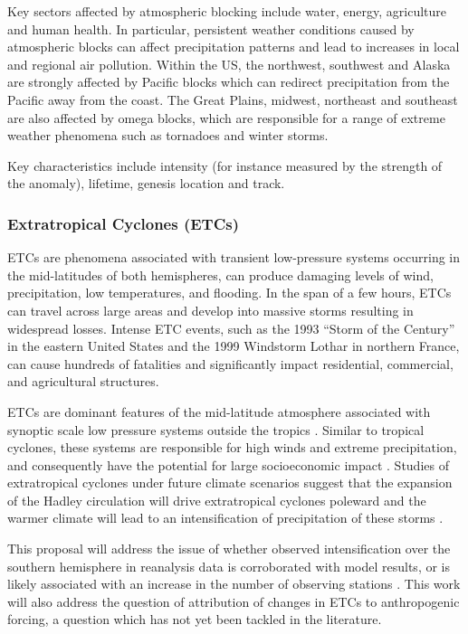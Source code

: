 \documentclass[11pt]{article}
\begin{document}
Key sectors affected by atmospheric blocking include water, energy, agriculture and human health.  In particular, persistent weather conditions caused by atmospheric blocks can affect precipitation patterns and lead to increases in local and regional air pollution.  Within the US, the northwest, southwest and Alaska are strongly affected by Pacific blocks which can redirect precipitation from the Pacific away from the coast.  The Great Plains, midwest, northeast and southeast are also affected by omega blocks, which are responsible for a range of extreme weather phenomena such as tornadoes and winter storms.

Key characteristics include intensity (for instance measured by the strength of the anomaly), lifetime, genesis location and track.

\subsubsection*{Extratropical Cyclones (ETCs)}

ETCs are phenomena associated with transient low-pressure systems occurring in the mid-latitudes of both hemispheres, can produce damaging levels of wind, precipitation, low temperatures, and flooding. In the span of a few hours, ETCs can travel across large areas and develop into massive storms resulting in widespread losses. Intense ETC events, such as the 1993 ``Storm of the Century'' in the eastern United States and the 1999 Windstorm Lothar in northern France, can cause hundreds of fatalities and significantly impact residential, commercial, and agricultural structures.

ETCs are dominant features of the mid-latitude atmosphere associated with synoptic scale low pressure systems outside the tropics \citep{serreze1995climatological}.  Similar to tropical cyclones, these systems are responsible for high winds and extreme precipitation, and consequently have the potential for large socioeconomic impact \citep{ulbrich2009extra}.  Studies of extratropical cyclones under future climate scenarios suggest that the expansion of the Hadley circulation will drive extratropical cyclones poleward \citep{bengtsson2006storm} and the warmer climate will lead to an intensification of precipitation of these storms \citep{bengtsson2009will, zappa2013multi}.

This proposal will address the issue of whether observed intensification over the southern hemisphere in reanalysis data is corroborated with model results, or is likely associated with an increase in the number of observing stations \citep{simmonds2000variability}.  This work will also address the question of attribution of changes in ETCs to anthropogenic forcing, a question which has not yet been tackled in the literature.
\end{document}
